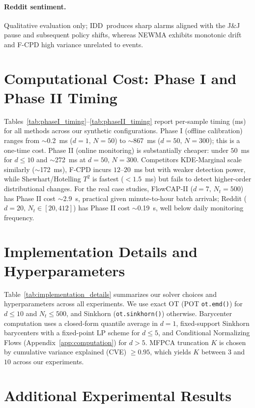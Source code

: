 \documentclass{article}
\newcommand{\algoname}{\textsc{IDD}\xspace}
\theoremstyle{plain}
\theoremstyle{definition}
\theoremstyle{remark}
\begin{document}
\paragraph{Reddit sentiment.} Qualitative evaluation only; \algoname\ produces sharp alarms aligned with the J\&J pause and subsequent policy shifts, whereas NEWMA exhibits monotonic drift and F-CPD high variance unrelated to events.

\section{Computational Cost: Phase I and Phase II Timing}\label{app:timing}
Tables~\ref{tab:phaseI_timing}--\ref{tab:phaseII_timing} report per-sample timing (ms) for all methods across our synthetic configurations. Phase I (offline calibration) ranges from $\sim$0.2~ms ($d{=}1,\,N{=}50$) to $\sim$867~ms ($d{=}50,\,N{=}300$); this is a one-time cost. Phase II (online monitoring) is substantially cheaper: under $50$~ms for $d\le 10$ and $\sim$272~ms at $d{=}50,\,N{=}300$. Competitors KDE-Marginal scale similarly ($\sim$172~ms), F-CPD incurs $12$--$20$~ms but with weaker detection power, while Shewhart/Hotelling $T^2$ is fastest ($<1.5$~ms) but fails to detect higher-order distributional changes. For the real case studies, FlowCAP-II ($d{=}7,\,N_t{=}500$) has Phase II cost $\sim$2.9~s, practical given minute-to-hour batch arrivals; Reddit ($d{=}20,\,N_t\in[20,412]$) has Phase II cost $\sim$0.19~s, well below daily monitoring frequency.



\section{Implementation Details and Hyperparameters}\label{app:impl_details}
Table~\ref{tab:implementation_details} summarizes our solver choices and hyperparameters across all experiments. We use exact OT (POT \texttt{ot.emd()}) for $d\le 10$ and $N_t\le 500$, and Sinkhorn (\texttt{ot.sinkhorn()}) otherwise. Barycenter computation uses a closed-form quantile average in $d{=}1$, fixed-support Sinkhorn barycenters with a fixed-point LP scheme for $d\le 5$, and Conditional Normalizing Flows (Appendix~\ref{app:computation}) for $d>5$. MFPCA truncation $K$ is chosen by cumulative variance explained (CVE) $\ge 0.95$, which yields $K$ between $3$ and $10$ across our experiments.


\section{Additional Experimental Results}
\label{app:synthetic_results}
\end{document}
